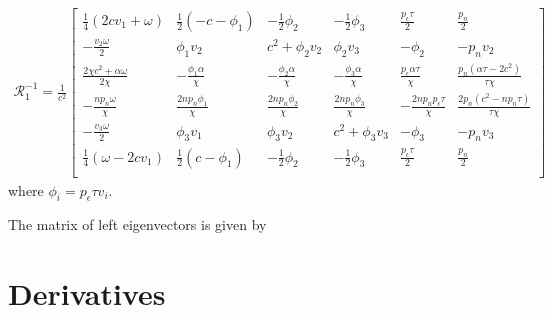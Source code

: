 \documentclass[onecolumn]{aastex62}
\begin{document}
\begin{align*}
  \mathcal{R}_{1}^{-1} = \frac{1}{c^2}
  \left[
  \begin{array}{cccccc}
   \frac{1}{4} (2 c  v_{1}+\omega ) & \frac{1}{2} (-c- \phi_{1} ) & -\frac{1}{2} \phi_{2}
    & -\frac{1}{2} \phi_{3}  & \frac{p_{\epsilon} \tau }{2} & \frac{p_{n}}{2}
     \\
   -\frac{v_{2} \omega }{2} & \phi_{1} v_{2}  & c^2+\phi_{2} v_{2}  &
     \phi_{2} v_{3}  & -\phi_{2}  & -p_{n} v_{2} \\
   \frac{2 \chi  c^2+\alpha  \omega }{2 \chi } & -\frac{\phi_{1} \alpha  }{\chi } &
     -\frac{\phi_{2} \alpha  }{\chi } & -\frac{\phi_{3} \alpha }{\chi } &
     \frac{p_{\epsilon} \alpha  \tau }{\chi } & \frac{p_{n} \left(\alpha  \tau -2 c^2\right)}{\tau  \chi } \\
   -\frac{n p_{n} \omega }{\chi } & \frac{2 n p_{n} \phi_{1} }{\chi } & \frac{2 n p_{n}
     \phi_{2} }{\chi } & \frac{2 n p_{n} \phi_{3} }{\chi } & -\frac{2 n
     p_{n} p_{\epsilon} \tau }{\chi } & \frac{2 p_{n} \left(c^2-n p_{n} \tau \right)}{\tau  \chi } \\
   -\frac{v_{3} \omega }{2} & \phi_{3} v_{1}  & \phi_{3} v_{2}   &
     c^2+\phi_{3} v_{3}  & -\phi_{3}  & -p_{n} v_{3} \\
   \frac{1}{4} (\omega -2 c  v_{1}) & \frac{1}{2} (c-\phi_{1} ) & -\frac{1}{2} \phi_{2}
       & -\frac{1}{2} \phi_{3}  & \frac{p_{\epsilon} \tau }{2} & \frac{p_{n}}{2}
     \\
  \end{array}
  \right]
\end{align*}
where $\phi_{i} = p_{\epsilon}\tau v_{i}$.

The matrix of left eigenvectors is given by


\appendix

\section{Derivatives}
\end{document}
